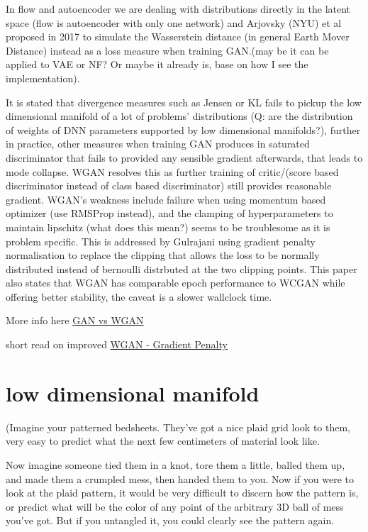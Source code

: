 \documentclass[honours,12pt]{unswthesis}
\numberwithin{equation}{section}
\begin{document}
In flow and autoencoder we are dealing with distributions directly in the latent space (flow is autoencoder with only one network) and Arjovsky (NYU) \cite{PMLR2017_WGAN} et al proposed in 2017 to simulate the Wasserstein distance (in general Earth Mover Distance) instead as a loss measure when training GAN.(may be it can be applied to VAE or NF? Or maybe it already is, base on how I see the implementation). 

It is stated that divergence measures such as Jensen or KL fails to pickup the low dimensional manifold of a lot of problems' distributions (Q: are the distribution of weights of DNN parameters supported by low dimensional manifolds?), further in practice, other measures when training GAN produces in saturated discriminator that fails to provided any sensible gradient afterwards, that leads to mode collapse. WGAN resolves this as further training of critic/(score based discriminator instead of class based discriminator) still provides reasonable gradient. WGAN's weakness include failure when using momentum based optimizer (use RMSProp instead), and the clamping of hyperparameters to maintain lipschitz (what does this mean?) seems to be troublesome as it is problem specific. This is addressed by Gulrajani \cite{NIPS2017_WGAN-GP} using gradient penalty normalisation to replace the clipping that allows the loss to be normally distributed instead of bernoulli distrbuted at the two clipping points. This paper also states that WGAN has comparable epoch performance to WCGAN while offering better stability, the caveat is a slower wallclock time. 

More info here \href{https://lilianweng.github.io/lil-log/2017/08/20/from-GAN-to-WGAN.html}{GAN vs WGAN}

short read on improved \href{https://towardsdatascience.com/demystified-wasserstein-gan-with-gradient-penalty-ba5e9b905ead}{WGAN - Gradient Penalty}

\section{low dimensional manifold}
(Imagine your patterned bedsheets. They've got a nice plaid grid look to them, very easy to predict what the next few centimeters of material look like.

Now imagine someone tied them in a knot, tore them a little, balled them up, and made them a crumpled mess, then handed them to you. Now if you were to look at the plaid pattern, it would be very difficult to discern how the pattern is, or predict what will be the color of any point of the arbitrary 3D ball of mess you've got. But if you untangled it, you could clearly see the pattern again.
\end{document}
